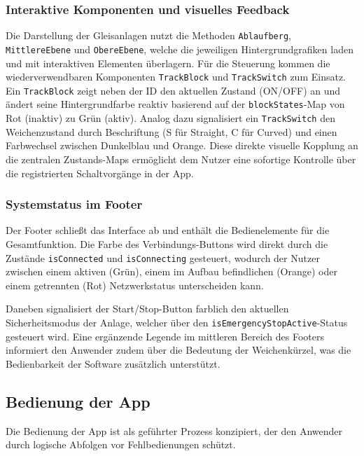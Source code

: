 \documentclass{article}
\begin{document}
\subsubsection{Interaktive Komponenten und visuelles Feedback}
Die Darstellung der Gleisanlagen nutzt die Methoden \texttt{Ablauf\-berg}, \texttt{Mittlere\-Ebene} und \texttt{Obere\-Ebene}, welche die jeweiligen Hintergrundgrafiken laden und mit interaktiven Elementen überlagern.
Für die Steuerung kommen die wiederverwendbaren Komponenten \texttt{Track\-Block} und \texttt{Track\-Switch} zum Einsatz.
Ein \texttt{Track\-Block} zeigt neben der ID den aktuellen Zustand (ON/OFF) an und ändert seine Hintergrundfarbe reaktiv basierend auf der \texttt{block\-States}-Map von Rot (inaktiv) zu Grün (aktiv).
Analog dazu signalisiert ein \texttt{Track\-Switch} den Weichenzustand durch Beschriftung (S für Straight, C für Curved) und einen Farbwechsel zwischen Dunkelblau und Orange.
Diese direkte visuelle Kopplung an die zentralen Zustands-Maps ermöglicht dem Nutzer eine sofortige Kontrolle über die registrierten Schaltvorgänge in der App.

\subsubsection{Systemstatus im Footer}
Der Footer schließt das Interface ab und enthält die Bedienelemente für die Gesamtfunktion.
Die Farbe des Verbindungs-Buttons wird direkt durch die Zustände \texttt{is\-Connected} und \texttt{is\-Connecting} gesteuert, wodurch der Nutzer zwischen einem aktiven (Grün), einem im Aufbau befindlichen (Orange) oder einem getrennten (Rot) Netzwerkstatus unterscheiden kann.

Daneben signalisiert der Start/Stop-Button farblich den aktuellen Sicherheitsmodus der Anlage, welcher über den \texttt{is\-Emergency\-Stop\-Active}-Status gesteuert wird.
Eine ergänzende Legende im mittleren Bereich des Footers informiert den Anwender zudem über die Bedeutung der Weichenkürzel, was die Bedienbarkeit der Software zusätzlich unterstützt.



\subsection{Bedienung der App}
Die Bedienung der App ist als geführter Prozess konzipiert, der den Anwender durch logische Abfolgen vor Fehlbedienungen schützt.
\end{document}
